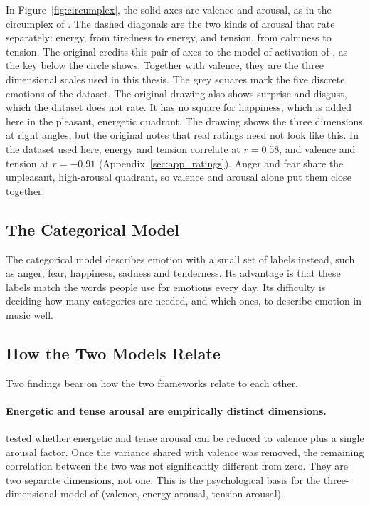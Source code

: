 In Figure~\ref{fig:circumplex}, the solid axes are valence and arousal, as in the circumplex of \citet{russell1980circumplex}. The dashed diagonals are the two kinds of arousal that \citet{eerola2011comparison} rate separately: energy, from tiredness to energy, and tension, from calmness to tension. The original credits this pair of axes to the model of activation of \citet{thayer1989biopsychology}, as the key below the circle shows. Together with valence, they are the three dimensional scales used in this thesis. The grey squares mark the five discrete emotions of the dataset. The original drawing also shows surprise and disgust, which the dataset does not rate. It has no square for happiness, which is added here in the pleasant, energetic quadrant. The drawing shows the three dimensions at right angles, but the original notes that real ratings need not look like this. In the dataset used here, energy and tension correlate at $r=0.58$, and valence and tension at $r=-0.91$ (Appendix~\ref{sec:app_ratings}). Anger and fear share the unpleasant, high-arousal quadrant, so valence and arousal alone put them close together.

\subsection{The Categorical Model}

The categorical model describes emotion with a small set of labels instead, such as anger, fear, happiness, sadness and tenderness. Its advantage is that these labels match the words people use for emotions every day. Its difficulty is deciding how many categories are needed, and which ones, to describe emotion in music well.

\subsection{How the Two Models Relate}
\label{subsec:fund_why_not_va}

Two findings bear on how the two frameworks relate to each other.

\paragraph{Energetic and tense arousal are empirically distinct dimensions.} \citet{schimmack2002experiencing} tested whether energetic and tense arousal can be reduced to valence plus a single arousal factor. Once the variance shared with valence was removed, the remaining correlation between the two was not significantly different from zero. They are two separate dimensions, not one. This is the psychological basis for the three-dimensional model of \citet{eerola2011comparison} (valence, energy arousal, tension arousal).

